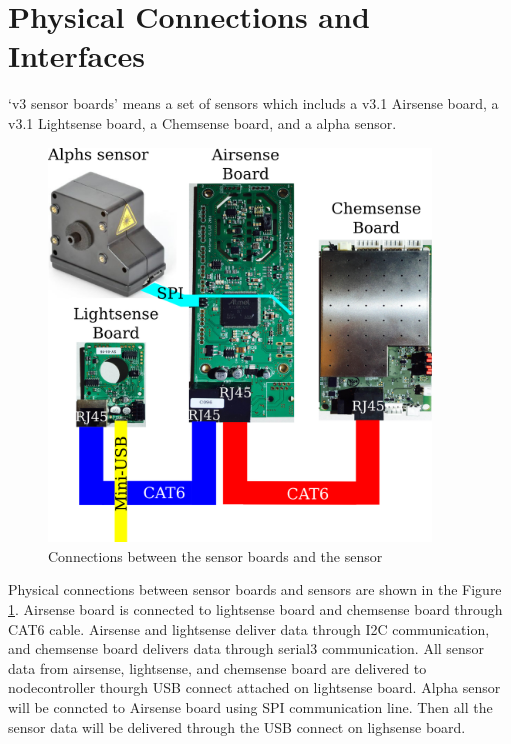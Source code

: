\section{Physical Connections and Interfaces}

`v3 sensor boards' means a set of sensors which includs a v3.1 Airsense board, a v3.1 Lightsense board, a Chemsense board, and a alpha sensor.

\begin{figure}[h]
\begin{center}
\includegraphics[width=4in]{g4353.png}
\caption{Connections between the sensor boards and the sensor}
\label{fig:physicalConnections}
\end{center}
\end{figure}

Physical connections between sensor boards and sensors are shown in the Figure \ref{fig:physicalConnections}. Airsense board is connected to lightsense board and chemsense board through CAT6 cable. Airsense and lightsense deliver data through I2C communication, and chemsense board delivers data through serial3 communication. All sensor data from airsense, lightsense, and chemsense board are delivered to nodecontroller thourgh USB connect attached on lightsense board. Alpha sensor will be conncted to Airsense board using SPI communication line. Then all the sensor data will be delivered through the USB connect on lighsense board.
